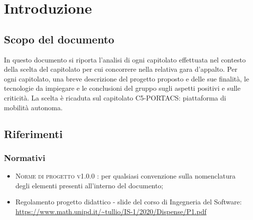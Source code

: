 \section{Introduzione}
\subsection{Scopo del documento}
In questo documento si riporta l'analisi di ogni capitolato effettuata nel contesto della scelta del capitolato per cui concorrere nella relativa gara d'appalto. Per ogni capitolato, una breve descrizione del progetto proposto e delle sue finalità, le tecnologie da impiegare e le conclusioni del gruppo sugli aspetti positivi e sulle criticità. La scelta è ricaduta sul capitolato C5-PORTACS: piattaforma di mobilità autonoma.


\subsection{Riferimenti}

\subsubsection{Normativi}

\begin{itemize}
	\item \textsc{Norme di progetto v1.0.0 }: per qualsiasi convenzione sulla nomenclatura degli elementi presenti all’interno del documento;
	\item Regolamento progetto didattico - slide del corso di Ingegneria del Software: \newline \url{https://www.math.unipd.it/~tullio/IS-1/2020/Dispense/P1.pdf}
\end{itemize}

